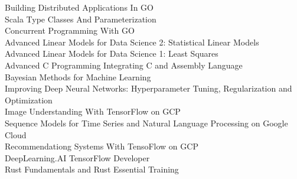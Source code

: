 \documentclass{myresume}
\begin{document}
        {Building Distributed Applications In GO} \\
        {Scala Type Classes And Parameterization} \\
        {Concurrent Programming With GO} \\
        {Advanced Linear Models for Data Science 2: Statistical Linear Models} \\
        {Advanced Linear Models for Data Science 1: Least Squares} \\
        {Advanced C Programming Integrating C and Assembly Language} \\
        {Bayesian Methods for Machine Learning} \\
        {Improving Deep Neural Networks: Hyperparameter Tuning, Regularization and Optimization} \\
        {Image Understanding With TensorFlow on GCP} \\
        {Sequence Models for Time Series and Natural Language Processing on Google Cloud} \\
        {Recommendationg Systems With TensoFlow on GCP} \\
        {DeepLearning.AI TensorFlow Developer} \\
        {Rust Fundamentals and Rust Essential Training} \\
    
\end{document}
